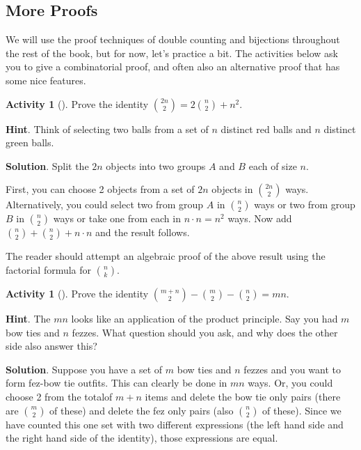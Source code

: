 \documentclass[10pt,]{book}
\theoremstyle{plain}
\theoremstyle{definition}
\theoremstyle{definition}
\theoremstyle{definition}
\newtheorem{activity}[project]{Activity}
\theoremstyle{definition}
\numberwithin{equation}{chapter}
\begin{document}
\subsection[{More Proofs}]{More Proofs}\label{subsec-moreproofs}
\hypertarget{p-581}{}%
We will use the proof techniques of double counting and bijections throughout the rest of the book, but for now, let's practice a bit.  The activities below ask you to give a combinatorial proof, and often also an alternative proof that has some nice features.%
\begin{activity}[]\label{act-redgreenballs}
\hypertarget{p-582}{}%
Prove the identity \(\binom{2n}{2} = 2 \binom{n}{2} + n^{2}\).%
\par\smallskip%
\noindent\textbf{Hint}.\hypertarget{hint-25}{}\quad%
\hypertarget{p-583}{}%
Think of selecting two balls from a set of \(n\) distinct red balls and \(n\) distinct green balls.%
\par\smallskip%
\noindent\textbf{Solution}.\hypertarget{solution-45}{}\quad%
\hypertarget{p-584}{}%
Split the \(2n\) objects into two groups \(A\) and \(B\) each of size \(n\).%
\par
\hypertarget{p-585}{}%
First, you can choose 2 objects from a set of \(2n\) objects in \(\binom{2n}{2}\) ways. Alternatively, you could select two from group \(A\) in \(\binom{n}{2}\) ways or two from group \(B\) in \(\binom{n}{2}\) ways or take one from each in \(n \cdot n = n^{2}\) ways. Now add \(\binom{n}{2} + \binom{n}{2}+ n \cdot n\) and the result follows.%
\end{activity}
\hypertarget{p-586}{}%
The reader should attempt an algebraic proof of the above result using the factorial formula for \(\binom{n}{k}\).%
\begin{activity}[]\label{act-bowtiefez}
\hypertarget{p-587}{}%
Prove the identity \(\binom{m + n}{2} - \binom{m}{2} - \binom{n}{2} = mn\).%
\par\smallskip%
\noindent\textbf{Hint}.\hypertarget{hint-26}{}\quad%
\hypertarget{p-588}{}%
The \(mn\) looks like an application of the product principle.  Say you had \(m\) bow ties and \(n\) fezzes.  What question should you ask, and why does the other side also answer this?%
\par\smallskip%
\noindent\textbf{Solution}.\hypertarget{solution-46}{}\quad%
\hypertarget{p-589}{}%
Suppose you have a set of \(m\) bow ties and \(n\) fezzes and you want to form fez-bow tie outfits. This can clearly be done in \(mn\) ways. Or, you could choose 2 from the totalof \(m + n\) items and delete the bow tie only pairs (there are \(\binom{m}{2}\) of these) and delete the fez only pairs (also \(\binom{n}{2}\) of these). Since we have counted this one set with two different expressions (the left hand side and the right hand side of the identity), those expressions are equal.%
\end{activity}
\end{document}

